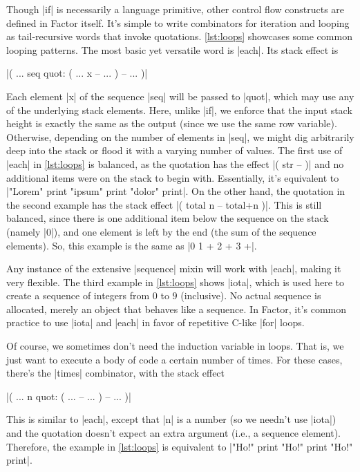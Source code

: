 
Though \factor|if| is necessarily a language primitive, other control flow
constructs are defined in Factor itself.  It's simple to write combinators for
iteration and looping as tail-recursive words that invoke quotations.
\vref{lst:loops} showcases some common looping patterns.  The most basic yet
versatile word is \factor|each|.  Its stack effect is
%
\begin{center}
%
  \factor|( ... seq quot: ( ... x -- ... ) -- ... )|
%
\end{center}
%
\noindent Each element \factor|x| of the sequence \factor|seq| will be passed
to \factor|quot|, which may use any of the underlying stack elements.  Here,
unlike \factor|if|, we enforce that the input stack height is exactly the same
as the output (since we use the same row variable).  Otherwise, depending on
the number of elements in \factor|seq|, we might dig arbitrarily deep into the
stack or flood it with a varying number of values.  The first use of
\factor|each| in \vref{lst:loops} is balanced, as the quotation has the effect
%
\factor|( str -- )|
%
and no additional items were on the stack to begin with.  Essentially, it's
equivalent to
%
\factor|"Lorem" print "ipsum" print "dolor" print|.
%
On the other hand, the quotation in the second example has the stack effect
%
\factor|( total n -- total+n )|.
%
This is still balanced, since there is one additional item below the sequence
on the stack (namely \factor|0|), and one element is left by the end (the sum
of the sequence elements).  So, this example is the same as
%
\factor|0 1 + 2 + 3 +|.

Any instance of the extensive \factor|sequence| mixin will work with
\factor|each|, making it very flexible.  The third example in \vref{lst:loops}
shows \factor|iota|, which is used here to create a  sequence of
integers from $0$ to $9$ (inclusive).  No actual sequence is allocated, merely
an object that behaves like a sequence.  In Factor, it's common practice to use
\factor|iota| and \factor|each| in favor of repetitive C-like |for|
loops.

Of course, we sometimes don't need the induction variable in loops.  That is,
we just want to execute a body of code a certain number of times.  For these
cases, there's the \factor|times| combinator, with the stack effect
%
\begin{center}
%
  \factor|( ... n quot: ( ... -- ... ) -- ... )|
%
\end{center}
%
\noindent This is similar to \factor|each|, except that \factor|n| is a number
(so we needn't use \factor|iota|) and the quotation doesn't expect an extra
argument (i.e., a sequence element).  Therefore, the example in
\vref{lst:loops} is equivalent to
%
\factor|"Ho!" print "Ho!" print "Ho!" print|.
%


